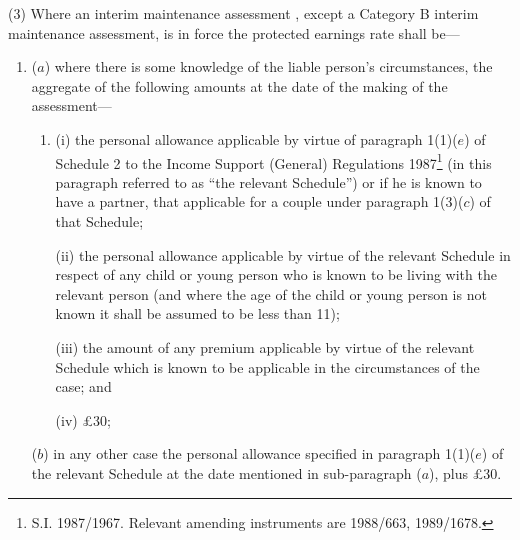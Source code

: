 \documentclass[12pt,a4paper]{article}
\begin{document}
(3) Where an interim maintenance assessment%
, except a Category B interim maintenance assessment,  %
is in force the protected earnings rate shall be—
\begin{enumerate}\item[]
($a$) where there is some knowledge of the liable person’s circumstances, the aggregate of the following amounts at the date of the making of the assessment—
\begin{enumerate}\item[]
(i) the personal allowance applicable by virtue of paragraph 1(1)($e$) of Schedule 2 to the Income Support (General) Regulations 1987\footnote{\frenchspacing S.I. 1987/1967. Relevant amending instruments are 1988/663, 1989/1678.} (in this paragraph referred to as “the relevant Schedule”) or if he is known to have a partner, that applicable for a couple under paragraph 1(3)($c$) of that Schedule;

(ii) the personal allowance applicable by virtue of the relevant Schedule in respect of any child or young person who is known to be living with the relevant person (and where the age of the child or young person is not known it shall be assumed to be less than 11);

(iii) the amount of any premium applicable by virtue of the relevant Schedule which is known to be applicable in the circumstances of the case; and

(iv) £30;
\end{enumerate}

($b$) in any other case the personal allowance specified in paragraph 1(1)($e$) of the relevant Schedule at the date mentioned in sub-\hspace{0pt}paragraph ($a$), plus £30.
\end{enumerate}
\end{document}
